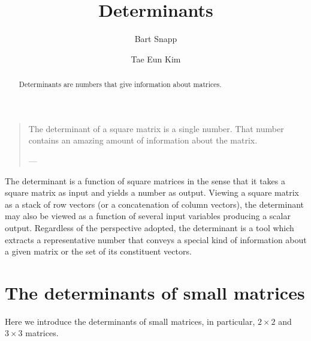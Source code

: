 \documentclass{ximera}
\author{Bart Snapp \and Tae Eun Kim}
\title{Determinants}
\begin{document}
\begin{abstract}
  Determinants are numbers that give information about matrices.
\end{abstract}
\maketitle



\begin{quote}
  The determinant of a square matrix is a single number. That number
  contains an amazing amount of information about the matrix.

  \hfill ---
\end{quote}

The determinant is a function of square matrices in the sense that it
takes a square matrix as input and yields a number as output. Viewing
a square matrix as a stack of row vectors (or a concatenation of
column vectors), the determinant may also be viewed as a function of
several input variables producing a scalar output. Regardless of the
perspective adopted, the determinant is a tool which extracts a
representative number that conveys a special kind of information about a
given matrix or the set of its constituent vectors.


\section{The determinants of small matrices}
Here we introduce the determinants of small matrices, in particular,
$2 \times 2$ and $3 \times 3$ matrices.
\end{document}
